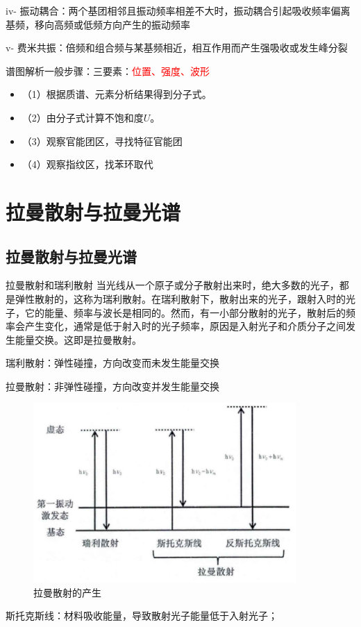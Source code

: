     iv- 振动耦合：两个基团相邻且振动频率相差不大时，振动耦合引起吸收频率偏离基频，移向高频或低频方向产生的振动频率

    v- 费米共振：倍频和组合频与某基频相近，相互作用而产生强吸收或发生峰分裂
\begin{note}
    谱图解析一般步骤：三要素：\textcolor{red}{位置、强度、波形}
    \begin{itemize}
        \item （1）根据质谱、元素分析结果得到分子式。
        \item （2）由分子式计算不饱和度$U$。
        \item （3）观察官能团区，寻找特征官能团
        \item （4）观察指纹区，找苯环取代
    \end{itemize}
\end{note}


\section{拉曼散射与拉曼光谱}
\subsection{拉曼散射与拉曼光谱}
\begin{definition*}{拉曼散射和瑞利散射}
	当光线从一个原子或分子散射出来时，绝大多数的光子，都是弹性散射的，这称为瑞利散射。在瑞利散射下，散射出来的光子，跟射入时的光子，它的能量、频率与波长是相同的。然而，有一小部分散射的光子，散射后的频率会产生变化，通常是低于射入时的光子频率，原因是入射光子和介质分子之间发生能量交换。这即是拉曼散射。
\end{definition*}
\begin{note}
	瑞利散射：弹性碰撞，方向改变而未发生能量交换
	
	拉曼散射：非弹性碰撞，方向改变并发生能量交换
\end{note}
\begin{figure}[ht]
	\centering
	\includegraphics[width=10cm]{image/chp5_sers.png}
	\caption{拉曼散射的产生}
	\label{fig:chp5_laman}
\end{figure}
斯托克斯线：材料吸收能量，导致散射光子能量低于入射光子；

